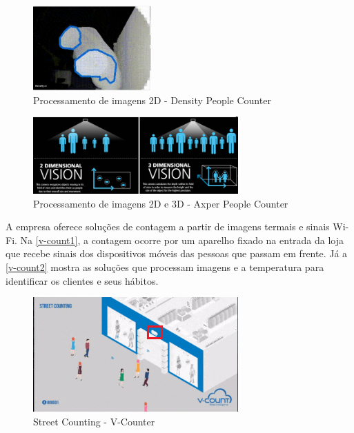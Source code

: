 \begin{figure}[htb]
  \caption{\label{density}Processamento de imagens 2D - Density People Counter}
  \begin{center}
    \includegraphics[width=0.40\textwidth]{img/density.png}
  \end{center}
\end{figure}

\begin{figure}[htb]
  \caption{\label{axper}Processamento de imagens 2D e 3D - Axper People Counter}
  \begin{center}
    \includegraphics[width=0.70\textwidth]{img/axper.png}
  \end{center}
\end{figure}

A empresa  oferece soluções de contagem a partir de imagens termais e sinais Wi-Fi. Na \autoref{v-count1}, a contagem ocorre por um
aparelho fixado na entrada da loja que recebe sinais dos dispositivos móveis das pessoas que passam em frente. Já a \autoref{v-count2}
mostra as soluções que processam imagens e a temperatura para identificar os clientes e seus hábitos.

\begin{figure}[htb]
  \caption{\label{v-count1}Street Counting - V-Counter}
  \begin{center}
    \includegraphics[width=0.70\textwidth]{img/v-count.png}
  \end{center}
\end{figure}

